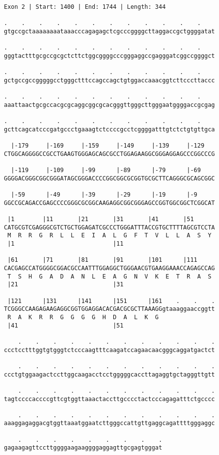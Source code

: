 \documentclass{article}
\begin{document}
\begin{Verbatim}
Exon 2 | Start: 1400 | End: 1744 | Length: 344
 
.    .    .    .    .    .    .    .    .    .    .    .    
gtgccgctaaaaaaaataaacccagagagctcgcccggggcttaggaccgctggggatat
  
.    .    .    .    .    .    .    .    .    .    .    .    
gggtactttgcgccgcgctcttctggcggggcccgggaggccgagggatcggccggggct
  
.    .    .    .    .    .    .    .    .    .    .    .    
gctgccgccgggggcctgggctttccagccagctgtggaccaaacggtcttcccttaccc
  
.    .    .    .    .    .    .    .    .    .    .    .    
aaattaactgcgccacgcgcaggcggcgcacgggttgggcttgggaatggggaccgcgag
  
.    .    .    .    .    .    .    .    .    .    .    .    
gcttcagcatcccgatgccctgaaagtctccccgcctcggggatttgtctctgtgttgca
  
  |-179     |-169     |-159     |-149     |-139     |-129   
CTGGCAGGGGCCGCCTGAAGTGGGAGCAGCGCCTGGAGAAGGCGGGAGGAGCCCGGCCCG
  
  |-119     |-109     |-99      |-89      |-79      |-69    
GGGGACGGGCGGCGGGATAGCGGGACCCCGGCGGCGCGGTGCGCTTCAGGGCGCAGCGGC
  
  |-59      |-49      |-39      |-29      |-19      |-9     
GGCCGCAGACCGAGCCCCGGGCGCGGCAAGAGGCGGCGGGAGCCGGTGGCGGCTCGGCAT
  
 |1        |11       |21       |31       |41       |51      
CATGCGTCGAGGGCGTCTGCTGGAGATCGCCCTGGGATTTACCGTGCTTTTAGCGTCCTA
 M  R  R  G  R  L  L  E  I  A  L  G  F  T  V  L  L  A  S  Y 
 |1                            |11                          
  
 |61       |71       |81       |91       |101      |111     
CACGAGCCATGGGGCGGACGCCAATTTGGAGGCTGGGAACGTGAAGGAAACCAGAGCCAG
 T  S  H  G  A  D  A  N  L  E  A  G  N  V  K  E  T  R  A  S 
 |21                           |31                          
  
 |121      |131      |141      |151      |161    .    .    .
TCGGGCCAAGAGAAGAGGCGGTGGAGGACACGACGCGCTTAAAGGgtaaaggaaccggtt
 R  A  K  R  R  G  G  G  G  H  D  A  L  K  G                
 |41                           |51                          
  
    .    .    .    .    .    .    .    .    .    .    .    .
ccctcctttggtgtgggtctcccaagtttcaagatccagaacaacgggcaggatgactct
  
    .    .    .    .    .    .    .    .    .    .    .    .
ccctgtggaagactccttggcaagacctcctgggggcaccttagaggtgctagggttgtt
  
    .    .    .    .    .    .    .    .    .    .    .    .
tagtccccaccccgttcgtggttaaactaccttgcccctactcccagagatttctgcccc
  
    .    .    .    .    .    .    .    .    .    .    .    .
aaaggagaggacgtggttaaatggaatcttgggccattgttgaggcagattttgggaggc
  
    .    .    .    .    .    .    .    .    .
gagaagagttccttggggaagaaggggaggagttgcgagtgggat
\end{Verbatim}
\end{document}
